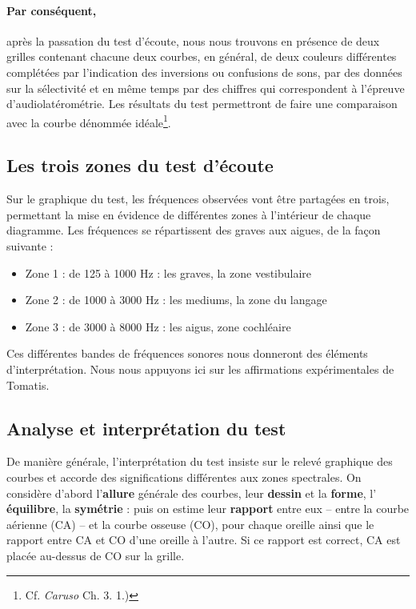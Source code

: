           \paragraph{\textbf{Par conséquent,}}après la passation du test d\textquoteright écoute, nous nous
trouvons en présence de deux grilles contenant chacune deux courbes,
en général, de deux couleurs différentes complétées par l'indication
des inversions ou confusions de sons, par des données sur la sélectivité
et en même temps par des chiffres qui correspondent à l'épreuve d'audiolatérométrie.
Les résultats du test permettront de faire une comparaison avec la
courbe dénommée idéale\footnote{Cf.\textit{ Caruso } Ch. 3. 1.)}.


\subsection{Les trois zones du test d'écoute }
Sur le graphique du test, les fréquences observées vont être partagées en
trois, permettant la mise en évidence de différentes zones à l\textquoteright intérieur
de chaque diagramme. Les fréquences se répartissent des
graves aux aigues, de la façon suivante :
\begin{itemize}
\item Zone 1 : de 125 à 1000 Hz : les graves, la zone vestibulaire
\item Zone 2 : de 1000 à 3000 Hz : les mediums, la zone du langage
\item Zone 3 : de 3000 à 8000 Hz : les aigus, zone cochléaire
\end{itemize}
Ces différentes bandes de fréquences sonores nous donneront des éléments
d'interprétation.
Nous nous appuyons ici sur les affirmations expérimentales de Tomatis.

\subsection {Analyse et interprétation du test}


De manière générale, l'interprétation du test insiste sur le relevé graphique
des
courbes et accorde des
significations différentes aux zones spectrales.
On considère d'abord l'\textbf{allure }générale des courbes, leur
\textbf{dessin} et la \textbf{forme}, l' \textbf{équilibre}, la \textbf{symétrie}  :
puis on estime
leur\textbf{ rapport} entre eux -- entre la courbe aérienne (CA) -- et la courbe osseuse (CO),
pour chaque oreille ainsi que le rapport entre CA et CO d\textquoteright une
oreille à l'autre. Si ce rapport est correct, CA est placée au-dessus
de CO sur la grille.

